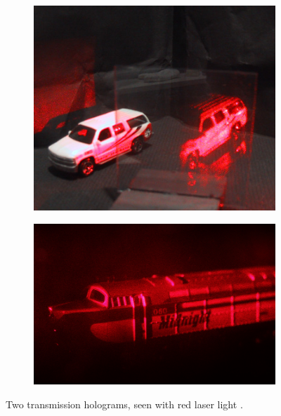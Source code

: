 \documentclass[12pt]{article}
\begin{document}
\begin{figure}[H]
    \centering
    \begin{subfigure}[b]{.43\textwidth}
        \centering
        \includegraphics[width=\linewidth]{transmission holo.jpg}
    \end{subfigure}
    \hfill
    \begin{subfigure}[b]{.55\textwidth}
        \centering
        \includegraphics[width=\linewidth]{trans 2 holo.jpg}
    \end{subfigure}
    \caption{\centering Two transmission holograms, seen with red laser light \protect\cite{transholo,reftransholo}.}
    \label{fig:7}
\end{figure}
\end{document}
